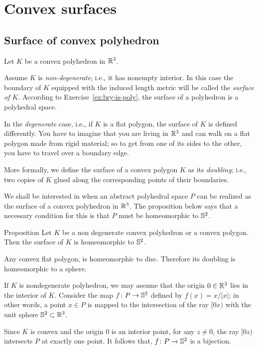 \chapter{Convex surfaces}\label{chap:unique}

\section{Surface of convex polyhedron}\label{sec:suface}

Let $K$ be a  convex polyhedron in $\mathbb{R}^3$.

Assume $K$ is \emph{non-degenerate}; i.e., it has nonempty interior.
In this case the boundary of $K$ equipped with the induced length metric will be called the \emph{surface of $K$}\label{def:surface}.
According to Exercise~\ref{ex:bry-is-poly}, the surface of a polyhedron is a polyhedral space.

In the \emph{degenerate} case,
i.e., if $K$ is a flat polygon, the surface of $K$ is defined differently.
You have to imagine that you are living in $\mathbb{R}^3$
and can walk on a flat polygon made from rigid material;
so to get from one of its sides to the other, you have to travel over a boundary edge.

More formally, we define the surface of a convex polygon $K$ as its \emph{doubling};
i.e., two copies of $K$ glued along the corresponding points of their boundaries.

We shall be interested in when an abstract polyhedral space $P$ can be realized as the surface of a convex polyhedron in $\mathbb{R}^3$.  
The proposition below 
says that a necessary condition for this is that $P$ must be homeomorphic to $\mathbb{S}^2$.

\begin{thm}{Proposition}\label{prop:P-is-S^2}
Let $K$ be a non degenerate convex polyhedron or a convex polygon.
Then the surface of $K$ is homeomorphic to $\mathbb{S}^2$.
\end{thm}

Any convex flat polygon,
is homeomorphic to disc.
Therefore its doubling is homeomorphic to a sphere. 

If $K$ is nondegenerate polyhedron, 
we may assume that the origin $0\in\mathbb{R}^3$ lies in the interior of $K$.
Consider the map $f\colon P\to \mathbb{S}^2$ defined by $f(x) = x/|x|$;
in other words, a point $x\in P$ is mapped to the intersection of the ray $[0x)$ with the unit sphere $\mathbb{S}^2\subset \mathbb{R}^3$.

Since $K$ is convex and the origin $0$ is an interior point, 
for any $z\neq 0$,
the ray $[0z)$ intersects $P$ at exactly one point.
It follows that, $f\colon P\to\mathbb{S}^2$ is a bijection. 

